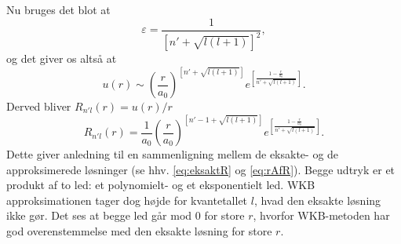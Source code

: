 Nu bruges det blot at
\begin{equation}
    \varepsilon = \frac{1}{\left[n'+\sqrt{l(l+1)}\right]^2},
\end{equation}
og det giver os altså at
\begin{equation}
    u(r) \sim {\left(\frac{r}{a_0}\right)}^{\left[n'+\sqrt{l(l+1)}\right]} e^{\left[\frac{1-\frac{r}{a_0}}{n'+\sqrt{l(l+1)}}\right]}.
\end{equation}
Derved bliver $R_{n'l}(r) = u(r)/r$
\begin{equation}
    R_{n'l}(r) = \frac{1}{a_0}{\left(\frac{r}{a_0}\right)}^{\left[n'-1+\sqrt{l(l+1)}\right]} e^{\left[\frac{1-\frac{r}{a_0}}{n'+\sqrt{l(l+1)}}\right]}.
  \label{eq:rAfR}
\end{equation}
Dette giver anledning til en sammenligning mellem de eksakte-  og de approksimerede løsninger (se hhv. \cref{eq:eksaktR} og \cref{eq:rAfR}). Begge udtryk er et produkt af to led: et polynomielt- og et eksponentielt led. WKB approksimationen tager dog højde for kvantetallet $l$, hvad den eksakte løsning ikke gør. Det ses at begge led går mod $0$ for store $r$, hvorfor WKB-metoden har god overenstemmelse med den eksakte løsning for store $r$.

